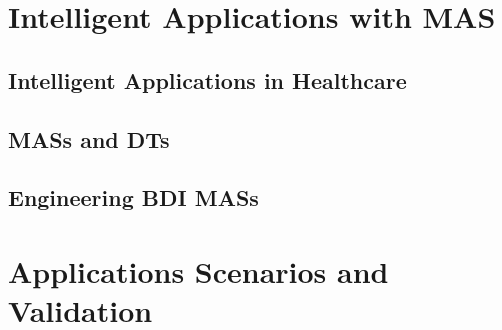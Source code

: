 \documentclass[12pt,a4paper,openright,twoside]{book}
\begin{document}


\part{Intelligent Applications with \acl{MAS}}
\label{part:mas}

\chapter{Intelligent Applications in Healthcare}
\label{chap:mas:requirements}



\chapter{\aclp{MAS} and \aclp{DT}}
\label{chap:mas:mas-dt}



\chapter{Engineering \acs{BDI} \aclp{MAS}}
\label{chap:mas:engineering}




\part{Applications Scenarios and Validation}
\label{part:validation}
\end{document}
